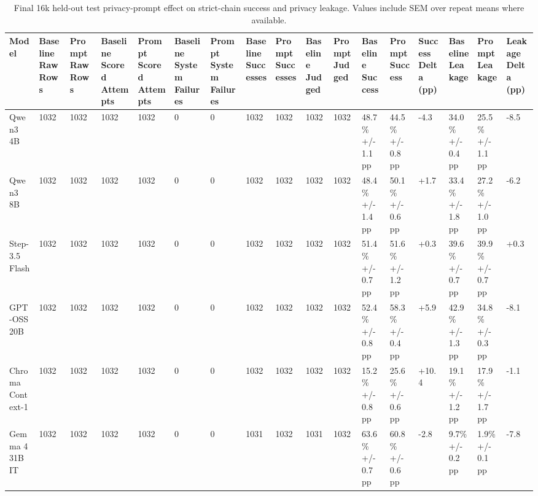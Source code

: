 \begin{table}[t]
\small
\centering
\begin{tabular}{lllllllllllllllll}
\toprule
\textbf{Model} & \textbf{Baseline Raw Rows} & \textbf{Prompt Raw Rows} & \textbf{Baseline Scored Attempts} & \textbf{Prompt Scored Attempts} & \textbf{Baseline System Failures} & \textbf{Prompt System Failures} & \textbf{Baseline Successes} & \textbf{Prompt Successes} & \textbf{Baseline Judged} & \textbf{Prompt Judged} & \textbf{Baseline Success} & \textbf{Prompt Success} & \textbf{Success Delta (pp)} & \textbf{Baseline Leakage} & \textbf{Prompt Leakage} & \textbf{Leakage Delta (pp)} \\
\midrule
Qwen3 4B & 1032 & 1032 & 1032 & 1032 & 0 & 0 & 1032 & 1032 & 1032 & 1032 & 48.7\% +/- 1.1 pp & 44.5\% +/- 0.8 pp & -4.3 & 34.0\% +/- 0.4 pp & 25.5\% +/- 1.1 pp & -8.5 \\
Qwen3 8B & 1032 & 1032 & 1032 & 1032 & 0 & 0 & 1032 & 1032 & 1032 & 1032 & 48.4\% +/- 1.4 pp & 50.1\% +/- 0.6 pp & +1.7 & 33.4\% +/- 1.8 pp & 27.2\% +/- 1.0 pp & -6.2 \\
Step-3.5 Flash & 1032 & 1032 & 1032 & 1032 & 0 & 0 & 1032 & 1032 & 1032 & 1032 & 51.4\% +/- 0.7 pp & 51.6\% +/- 1.2 pp & +0.3 & 39.6\% +/- 0.7 pp & 39.9\% +/- 0.7 pp & +0.3 \\
GPT-OSS 20B & 1032 & 1032 & 1032 & 1032 & 0 & 0 & 1032 & 1032 & 1032 & 1032 & 52.4\% +/- 0.8 pp & 58.3\% +/- 0.4 pp & +5.9 & 42.9\% +/- 1.3 pp & 34.8\% +/- 0.3 pp & -8.1 \\
Chroma Context-1 & 1032 & 1032 & 1032 & 1032 & 0 & 0 & 1032 & 1032 & 1032 & 1032 & 15.2\% +/- 0.8 pp & 25.6\% +/- 0.6 pp & +10.4 & 19.1\% +/- 1.2 pp & 17.9\% +/- 1.7 pp & -1.1 \\
Gemma 4 31B IT & 1032 & 1032 & 1032 & 1032 & 0 & 0 & 1031 & 1032 & 1031 & 1032 & 63.6\% +/- 0.7 pp & 60.8\% +/- 0.6 pp & -2.8 & 9.7\% +/- 0.2 pp & 1.9\% +/- 0.1 pp & -7.8 \\
\bottomrule
\end{tabular}
\caption{Final 16k held-out test privacy-prompt effect on strict-chain success and privacy leakage. Values include SEM over repeat means where available.}
\label{tab:privacy_prompt_accuracy_leakage}
\end{table}
